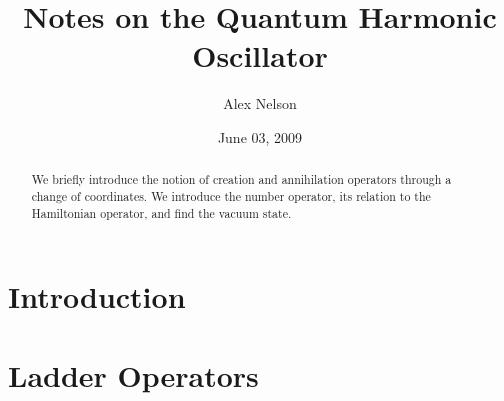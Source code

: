 \documentclass{amsart}
\title{Notes on the Quantum Harmonic Oscillator}
\date{June 03, 2009}
\author{Alex Nelson}
\numberwithin{equation}{section}
\theoremstyle{definition}
\begin{document}
\begin{abstract}
We briefly introduce the notion of creation and annihilation
operators through a change of coordinates. We introduce the
number operator, its relation to the Hamiltonian operator, and
find the vacuum state.
\end{abstract}
\maketitle
\section{Introduction}

\section{Ladder Operators}

\nocite{sakurai}


\end{document}

